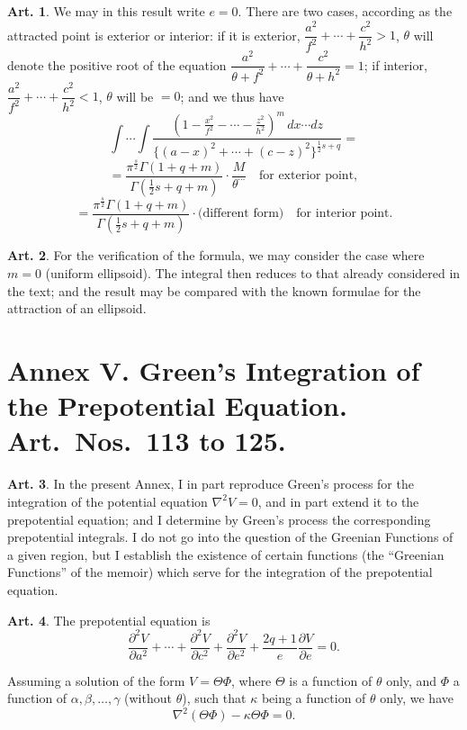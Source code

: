\documentclass[12pt,a4paper]{article}
\theoremstyle{definition}
\newtheorem{art}{Art.}[section]
\begin{document}
\begin{art}\label{art:101}
We may in this result write $e = 0$. There are two cases, according as the attracted point is exterior or interior: if it is exterior, $\dfrac{a^2}{f^2} + \cdots + \dfrac{c^2}{h^2} > 1$, $\theta$ will denote the positive root of the equation $\dfrac{a^2}{\theta+f^2} + \cdots + \dfrac{c^2}{\theta+h^2} = 1$; if interior, $\dfrac{a^2}{f^2} + \cdots + \dfrac{c^2}{h^2} < 1$, $\theta$ will be $= 0$; and we thus have
\[
\int \cdots \int \frac{(1-\frac{x^2}{f^2}-\cdots-\frac{z^2}{h^2})^m \, dx \cdots dz}{\{(a-x)^2+\cdots+(c-z)^2\}^{\frac{1}{2}s+q}} =
\]
\[
= \frac{\pi^{\frac{s}{2}}\Gamma(1+q+m)}{\Gamma(\frac{1}{2}s+q+m)} \cdot \frac{M}{\theta^{\cdots}} \quad \text{for exterior point},
\]
\[
= \frac{\pi^{\frac{s}{2}}\Gamma(1+q+m)}{\Gamma(\frac{1}{2}s+q+m)} \cdot \text{(different form)} \quad \text{for interior point}.
\]
\end{art}

\begin{art}\label{art:102}
For the verification of the formula, we may consider the case where $m = 0$ (uniform ellipsoid). The integral then reduces to that already considered in the text; and the result may be compared with the known formulae for the attraction of an ellipsoid.
\end{art}

\newpage
\section*{Annex V. Green's Integration of the Prepotential Equation. Art.\ Nos.\ 113 to 125.}

\begin{art}\label{art:113}
In the present Annex, I in part reproduce Green's process for the integration of the potential equation $\nabla^2 V = 0$, and in part extend it to the prepotential equation; and I determine by Green's process the corresponding prepotential integrals. I do not go into the question of the Greenian Functions of a given region, but I establish the existence of certain functions (the ``Greenian Functions'' of the memoir) which serve for the integration of the prepotential equation.
\end{art}

\begin{art}\label{art:114}
The prepotential equation is
\[
\frac{\partial^2 V}{\partial a^2} + \cdots + \frac{\partial^2 V}{\partial c^2} + \frac{\partial^2 V}{\partial e^2} + \frac{2q+1}{e}\frac{\partial V}{\partial e} = 0.
\]

Assuming a solution of the form $V = \Theta \Phi$, where $\Theta$ is a function of $\theta$ only, and $\Phi$ a function of $\alpha, \beta, \ldots, \gamma$ (without $\theta$), such that $\kappa$ being a function of $\theta$ only, we have
\[
\nabla^2 (\Theta\Phi) - \kappa\Theta\Phi = 0.
\]
\end{art}
\end{document}

